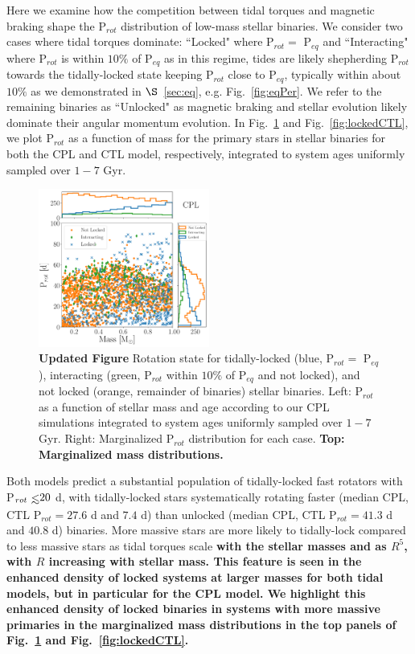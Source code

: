 \documentclass[twocolumn]{aastex61}
\def\lsim{~\rlap{$<$}{\lower 1.0ex\hbox{$\sim$}}}
\newcommand{\xxx}[1]{{\textbf{#1}}}
\begin{document}
Here we examine how the competition between tidal torques and magnetic braking shape the P$_{rot}$ distribution of low-mass stellar binaries.  We consider two cases where tidal torques dominate: ``Locked" where P$_{rot} = $ P$_{eq}$ and ``Interacting" where P$_{rot}$ is within $10\%$ of P$_{eq}$ as in this regime, tides are likely shepherding P$_{rot}$ towards the tidally-locked state keeping P$_{rot}$ close to P$_{eq}$, typically within about $10\%$ as we demonstrated in $\S$~\ref{sec:eq}, e.g. Fig.~\ref{fig:eqPer}. We refer to the remaining binaries as ``Unlocked" as magnetic braking and stellar evolution likely dominate their angular momentum evolution.  In Fig.~\ref{fig:lockedCPL} and Fig.~\ref{fig:lockedCTL}, we plot P$_{rot}$ as a function of mass for the primary stars in stellar binaries for both the CPL and CTL model, respectively, integrated to system ages uniformly sampled over $1-7$ Gyr.  

\begin{figure}
	\includegraphics[width=0.5\textwidth]{../Plots/lockedCPL.pdf}
   \caption{\xxx{Updated Figure} Rotation state for tidally-locked (blue, P$_{rot} = $ P$_{eq}$), interacting (green, P$_{rot}$ within $10\%$ of P$_{eq}$ and not locked), and not locked (orange, remainder of binaries) stellar binaries. Left: P$_{rot}$ as a function of stellar mass and age according to our CPL simulations integrated to system ages uniformly sampled over $1-7$ Gyr. Right: Marginalized P$_{rot}$ distribution for each case. \xxx{Top: Marginalized mass distributions.}}%
    \label{fig:lockedCPL}%
\end{figure}

Both models predict a substantial population of tidally-locked fast rotators with P$_{rot} \lsim 20$ d, with tidally-locked stars systematically rotating faster (median CPL, CTL P$_{rot} = 27.6$ d and $7.4$ d) than unlocked (median CPL, CTL P$_{rot} = 41.3$ d and $40.8$ d) binaries. More massive stars are more likely to tidally-lock compared to less massive stars as tidal torques scale \xxx{with the stellar masses and as $R^5$, with $R$ increasing with stellar mass.  This feature is seen in the enhanced density of locked systems at larger masses for both tidal models, but in particular for the CPL model. We highlight this enhanced density of locked binaries in systems with more massive primaries in the marginalized mass distributions in the top panels of Fig.~\ref{fig:lockedCPL} and Fig.~\ref{fig:lockedCTL}.}
\end{document}
